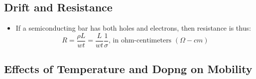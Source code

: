\documentclass{article}
\begin{document}
\subsection{Drift and Resistance}
\begin{itemize}
\item If a semiconducting bar has both holes and electrons, then resistance is thus:
  \begin{equation}
    R = \frac{\rho L}{wt}=\frac{L}{wt}\frac{1}{\sigma}\text{, in ohm-centimeters }(\Omega-cm)
  \end{equation}
\end{itemize}

\subsection{Effects of Temperature and Dopng on Mobility}
\end{document}
